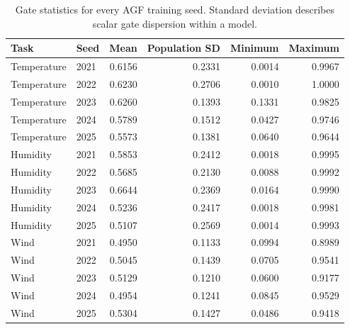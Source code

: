 \documentclass[10pt,a4paper]{article}
\begin{document}
\begin{table}[H]\centering\small\setlength{\tabcolsep}{5pt}\setlength{\parskip}{0pt}

\caption{Gate statistics for every AGF training seed. Standard deviation describes scalar gate dispersion within a model.}\label{tab:gate_seed}

\begin{tabular}{llrrrr}

\toprule
Task & Seed & Mean & Population SD & Minimum & Maximum \\
\midrule

Temperature & 2021 & 0.6156 & 0.2331 & 0.0014 & 0.9967 \\

Temperature & 2022 & 0.6230 & 0.2706 & 0.0010 & 1.0000 \\

Temperature & 2023 & 0.6260 & 0.1393 & 0.1331 & 0.9825 \\

Temperature & 2024 & 0.5789 & 0.1512 & 0.0427 & 0.9746 \\

Temperature & 2025 & 0.5573 & 0.1381 & 0.0640 & 0.9644 \\

Humidity & 2021 & 0.5853 & 0.2412 & 0.0018 & 0.9995 \\

Humidity & 2022 & 0.5685 & 0.2130 & 0.0088 & 0.9992 \\

Humidity & 2023 & 0.6644 & 0.2369 & 0.0164 & 0.9990 \\

Humidity & 2024 & 0.5236 & 0.2417 & 0.0018 & 0.9981 \\

Humidity & 2025 & 0.5107 & 0.2569 & 0.0014 & 0.9993 \\

Wind & 2021 & 0.4950 & 0.1133 & 0.0994 & 0.8989 \\

Wind & 2022 & 0.5045 & 0.1439 & 0.0705 & 0.9541 \\

Wind & 2023 & 0.5129 & 0.1210 & 0.0600 & 0.9177 \\

Wind & 2024 & 0.4954 & 0.1241 & 0.0845 & 0.9529 \\

Wind & 2025 & 0.5304 & 0.1427 & 0.0486 & 0.9418 \\


\end{tabular}
\end{table}
\end{document}
